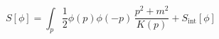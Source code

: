 \begin{equation}
S[\phi] =  \int_p \frac{1}{2} \phi (p) \phi (-p) \, \frac{p^2 +
m^2}{K(p)} + S_{\text{int}} [\phi]
\end{equation}

